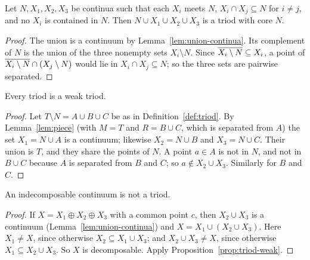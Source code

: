 \begin{lemma}\label{lem:core}
Let $N,X_1,X_2,X_3$ be continua such that each $X_i$ meets $N$, $X_i\cap X_j\subseteq N$ for $i\ne j$,
and no $X_i$ is contained in $N$. Then $N\cup X_1\cup X_2\cup X_3$ is a triod with core $N$.
\end{lemma}

\begin{proof}
The union is a continuum by Lemma~\ref{lem:union-continua}. Its complement of $N$ is the union of
the three nonempty sets $X_i\setminus N$. Since $\overline{X_i\setminus N}\subseteq X_i$, a point of
$\overline{X_i\setminus N}\cap(X_j\setminus N)$ would lie in $X_i\cap X_j\subseteq N$; so the three sets are
pairwise separated.
\end{proof}


\begin{proposition}\label{prop:triod-weak}
Every triod is a weak triod.
\end{proposition}

\begin{proof}
Let $T\setminus N=A\cup B\cup C$ be as in Definition~\ref{def:triod}. By Lemma~\ref{lem:piece} (with
$M=T$ and $R=B\cup C$, which is separated from $A$) the set $X_1=N\cup A$ is a continuum; likewise
$X_2=N\cup B$ and $X_3=N\cup C$. Their union is $T$, and they share the points of $N$. A point $a\in A$ is
not in $N$, and not in $B\cup C$ because $A$ is separated from $B$ and $C$; so $a\notin X_2\cup X_3$.
Similarly for $B$ and $C$.
\end{proof}


\begin{corollary}\label{cor:indec-not-triod}
An indecomposable continuum is not a triod.
\end{corollary}

\begin{proof}
If $X=X_1\oplus X_2\oplus X_3$ with a common point $c$, then $X_2\cup X_3$ is a continuum
(Lemma~\ref{lem:union-continua}) and $X=X_1\cup(X_2\cup X_3)$. Here $X_1\ne X$, since otherwise
$X_2\subseteq X_1\cup X_3$; and $X_2\cup X_3\ne X$, since otherwise $X_1\subseteq X_2\cup X_3$. So $X$ is
decomposable. Apply Proposition~\ref{prop:triod-weak}.
\end{proof}


